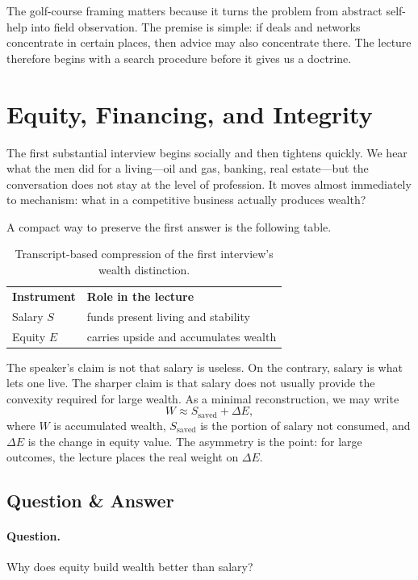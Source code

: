 The golf-course framing matters because it turns the problem from abstract self-help into field observation. The premise is simple: if deals and networks concentrate in certain places, then advice may also concentrate there. The lecture therefore begins with a search procedure before it gives us a doctrine.

\section{Equity, Financing, and Integrity}

The first substantial interview begins socially and then tightens quickly. We hear what the men did for a living---oil and gas, banking, real estate---but the conversation does not stay at the level of profession. It moves almost immediately to mechanism: what in a competitive business actually produces wealth?

A compact way to preserve the first answer is the following table.
\begin{table}[h]
\centering
\begin{tabular}{ll}
\textbf{Instrument} & \textbf{Role in the lecture} \\
Salary $S$ & funds present living and stability \\
Equity $E$ & carries upside and accumulates wealth
\end{tabular}
\caption{Transcript-based compression of the first interview's wealth distinction.}
\end{table}

The speaker's claim is not that salary is useless. On the contrary, salary is what lets one live. The sharper claim is that salary does not usually provide the convexity required for large wealth. As a minimal reconstruction, we may write
\begin{equation}
W \approx S_{\mathrm{saved}} + \Delta E,
\end{equation}
where $W$ is accumulated wealth, $S_{\mathrm{saved}}$ is the portion of salary not consumed, and $\Delta E$ is the change in equity value. The asymmetry is the point: for large outcomes, the lecture places the real weight on $\Delta E$.

\subsection{Question \& Answer}

\paragraph{Question.} Why does equity build wealth better than salary?

